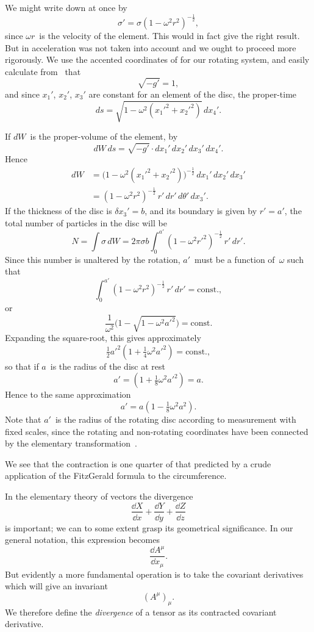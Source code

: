 \documentclass[12pt]{book}
\begin{document}
We might write down at once by~
\[
\sigma' = \sigma (1 - \omega^{2} r^{2})^{-\frac{1}{2}},
\]
since $\omega r$~is the velocity of the element. This would in fact give the right
result. But in  acceleration was not taken into account and we ought to
proceed more rigorously. We use the accented coordinates of  for our
rotating system, and easily calculate from~ that
\[
\sqrt{-g'} = 1,
\]
and since $x_{1}'$, $x_{2}'$, $x_{3}'$ are constant for an element of the disc, the proper-time
\[
ds = \sqrt{1 - \omega^{2}(x_{1}'^{2} + x_{2}'^{2})}\, dx_{4}'.
\]

If $dW$~is the proper-volume of the element, by~
\[
dW\, ds = \sqrt{-g'} \cdot dx_{1}'\, dx_{2}'\, dx_{3}'\, dx_{4}'.
\]
Hence
\begin{align*}
  dW &= \bigl(1 - \omega^{2}(x_{1}'^{2} + x_{2}'^{2})\bigr)^{-\frac{1}{2}}\, dx_{1}'\, dx_{2}'\, dx_{3}' \\
  &= (1 - \omega^{2} r^{2})^{-\frac{1}{2}}\, r'\, dr'\, d\theta'\, dx_{3}'.
\end{align*}
If the thickness of the disc is $\delta x_{3}' = b$, and its boundary is given by $r' = a'$,
the total number of particles in the disc will be
\[
N = \int \sigma\, dW
= 2\pi\sigma b \int_{0}^{a'} (1 - \omega^{2} r'^{2})^{-\frac{1}{2}}\, r'\, dr'.
\]
Since this number is unaltered by the rotation, $a'$~must be a function of~$\omega$
such that
\[
\int_{0}^{a'} (1 - \omega^{2} r^{2})^{-\frac{1}{2}}\, r'\, dr' = \text{const.},
\]
or
\[
\frac{1}{\omega^{2}}\bigl(1 - \sqrt{1 - \omega^{2} a'^{2}}\bigr) = \text{const.}
\]
Expanding the square-root, this gives approximately
\[
\tfrac{1}{2} a'^{2} (1 + \tfrac{1}{4} \omega^{2} a'^{2}) = \text{const.},
\]
so that if $a$~is the radius of the disc at rest
\[
a' = (1 + \tfrac{1}{8} \omega^{2} a'^{2}) = a.
\]
Hence to the same approximation
\[
a' = a (1 - \tfrac{1}{8} \omega^{2} a^{2}).
\]
Note that $a'$~is the radius of the rotating disc according to measurement with
fixed scales, since the rotating and non-rotating coordinates have been connected
by the elementary transformation~.

We see that the contraction is one quarter of that predicted by a crude
application of the FitzGerald formula to the circumference.

%
%

In the elementary theory of vectors the divergence
\[
\frac{\dd X}{\dd x} + \frac{\dd Y}{\dd y} + \frac{\dd Z}{\dd z}
\]
is important; we can to some extent grasp its geometrical significance. In
our general notation, this expression becomes
\[
\frac{\dd A^{\mu}}{\dd x_{\mu}}.
\]
But evidently a more fundamental operation is to take the covariant derivatives
which will give an invariant
\[
(A^{\mu})_{\mu}.
\]
We therefore define the \emph{divergence} of a tensor as its contracted covariant
derivative.
\end{document}
